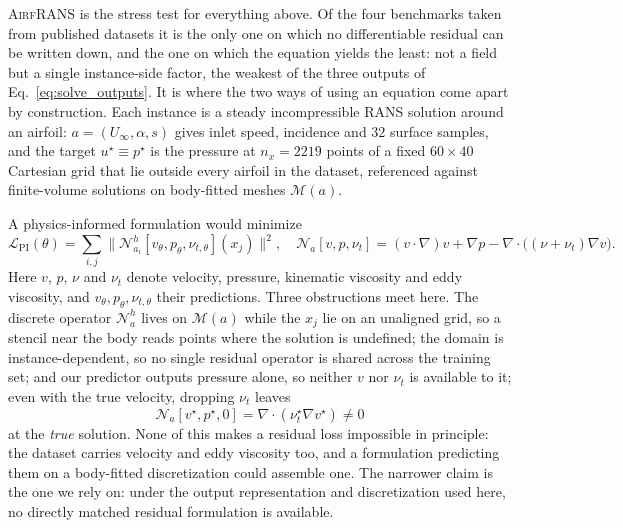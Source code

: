 \documentclass{article}
\begin{document}
\textsc{AirfRANS} \citep{bonnet2022airfrans} is the stress test for everything above.
Of the four benchmarks taken from published datasets it is the only one on which no
differentiable residual can be written down, and the one on which the equation yields
the least: not a field but a single instance-side factor, the weakest of the three
outputs of Eq.~\ref{eq:solve_outputs}. It is where the two ways of using an equation
come apart by construction. Each instance is a steady incompressible RANS
solution around an airfoil: $a=(U_\infty,\alpha,s)$ gives inlet speed, incidence and
$32$ surface samples, and the target $u^\star \equiv p^\star$ is the pressure at
$n_x = 2219$ points of a fixed $60\times40$ Cartesian grid that lie outside every airfoil in the dataset, referenced against
finite-volume solutions on body-fitted meshes $\mathcal{M}(a)$.

A physics-informed formulation would minimize
\begin{equation}
  \mathcal{L}_{\mathrm{PI}}(\theta) =
  \sum_{i,j} \bigl\| \mathcal{N}^{h}_{a_i}[v_\theta, p_\theta, \nu_{t,\theta}](x_j) \bigr\|^2,
  \quad
  \mathcal{N}_a[v,p,\nu_t] = (v\!\cdot\!\nabla)v + \nabla p
  - \nabla\!\cdot\!\bigl((\nu + \nu_t)\nabla v\bigr).
  \label{eq:pi-loss}
\end{equation}
Here \(v\), \(p\), \(\nu\) and \(\nu_t\) denote velocity, pressure, kinematic viscosity and eddy viscosity, and \(v_\theta, p_\theta, \nu_{t,\theta}\) their predictions. Three obstructions meet here. The discrete operator $\mathcal{N}^h_a$ lives on
$\mathcal{M}(a)$ while the $x_j$ lie on an unaligned grid, so a stencil near the body
reads points where the solution is undefined; the domain is instance-dependent, so no
single residual operator is shared across the training set; and our predictor outputs
pressure alone, so neither \(v\) nor \(\nu_t\) is available to it; even with the true velocity, dropping \(\nu_t\) leaves
\begin{equation}
  \mathcal{N}_a[v^\star, p^\star, 0] = \nabla\!\cdot\!(\nu_t^\star \nabla v^\star) \neq 0
  \label{eq:closure}
\end{equation}
at the \emph{true} solution. None of this makes a residual loss impossible in
principle: the dataset carries velocity and eddy viscosity too, and a formulation
predicting them on a body-fitted discretization could assemble one. The narrower claim
is the one we rely on: under the output representation and discretization used here,
no directly matched residual formulation is available.
\end{document}
